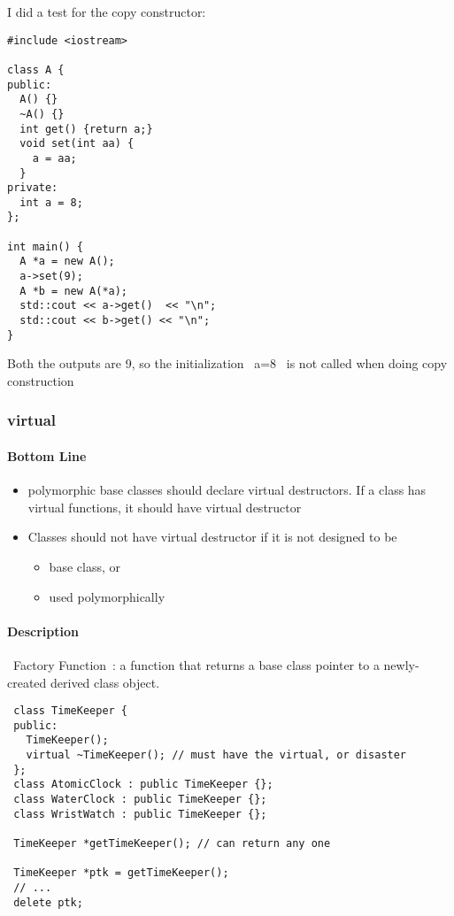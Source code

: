 I did a test for the copy constructor:

\begin{lstlisting}
#include <iostream>

class A {
public:
  A() {}
  ~A() {}
  int get() {return a;}
  void set(int aa) {
    a = aa;
  }
private:
  int a = 8;
};

int main() {
  A *a = new A();
  a->set(9);
  A *b = new A(*a);
  std::cout << a->get()  << "\n";
  std::cout << b->get() << "\n";
}
\end{lstlisting}

Both the outputs are 9, so the initialization ~a=8~ is not called when
doing copy construction

\subsubsection{virtual}
\paragraph{Bottom Line}
\begin{itemize}
\item polymorphic base classes should declare virtual destructors.
  If a class has virtual functions, it should have virtual destructor
\item Classes should not have virtual destructor if it is not
  designed to be
  \begin{itemize}
  \item  base class, or
  \item  used polymorphically
  \end{itemize}
\end{itemize}
\paragraph{Description}
~Factory Function~: a function that returns a base class pointer to a
newly-created derived class object.

\begin{lstlisting}
 class TimeKeeper {
 public:
   TimeKeeper();
   virtual ~TimeKeeper(); // must have the virtual, or disaster
 };
 class AtomicClock : public TimeKeeper {};
 class WaterClock : public TimeKeeper {};
 class WristWatch : public TimeKeeper {};

 TimeKeeper *getTimeKeeper(); // can return any one

 TimeKeeper *ptk = getTimeKeeper();
 // ...
 delete ptk;
\end{lstlisting}

